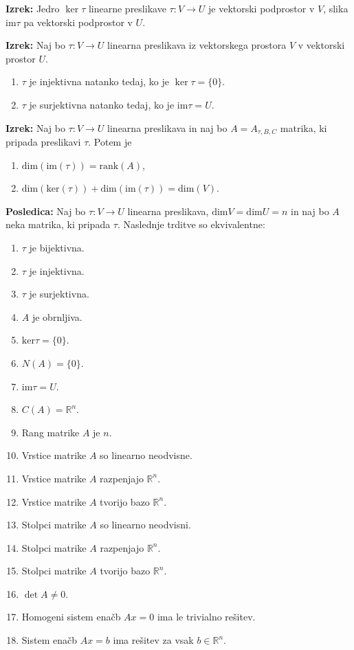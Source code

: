 \documentclass{article}
\begin{document}
\begin{multicols}{2}
\textbf{Izrek:} Jedro \( \ker \tau \) linearne preslikave \( \tau: V \rightarrow U \) je vektorski podprostor v \( V \), slika \( \text{im} \tau \) pa vektorski podprostor v \( U \).

\textbf{Izrek:} Naj bo \( \tau: V \rightarrow U \) linearna preslikava iz vektorskega prostora \( V \) v vektorski prostor \( U \).
\begin{enumerate}
    \item \( \tau \) je injektivna natanko tedaj, ko je \( \ker \tau = \{0\} \).
    \item \( \tau \) je surjektivna natanko tedaj, ko je \( \text{im} \tau = U \).
\end{enumerate}

\textbf{Izrek:} Naj bo \( \tau: V \rightarrow U \) linearna preslikava in naj bo \( A = A_{\tau,B,C} \) matrika, ki pripada preslikavi \( \tau \). Potem je
\begin{enumerate}
    \item \( \text{dim}(\text{im}(\tau)) = \text{rank}(A) \),
    \item \( \text{dim}(\text{ker}(\tau)) + \text{dim}(\text{im}(\tau)) = \text{dim}(V) \).
\end{enumerate}

\textbf{Posledica:} Naj bo \( \tau: V \rightarrow U \) linearna preslikava, \(\text{dim} V = \text{dim} U = n\) in naj bo \( A \) neka matrika, ki pripada \( \tau \). Naslednje trditve so ekvivalentne:
\begin{enumerate}
    \item \( \tau \) je bijektivna.
    \item \( \tau \) je injektivna.
    \item \( \tau \) je surjektivna.
    \item \( A \) je obrnljiva.
    \item \( \text{ker} \tau = \{0\} \).
    \item \( N(A) = \{0\} \).
    \item \( \text{im} \tau = U \).
    \item \( C(A) = \mathbb{R}^n \).
    \item Rang matrike \( A \) je \( n \).
    \item Vrstice matrike \( A \) so linearno neodvisne.
    \item Vrstice matrike \( A \) razpenjajo \( \mathbb{R}^n \).
    \item Vrstice matrike \( A \) tvorijo bazo \( \mathbb{R}^n \).
    \item Stolpci matrike \( A \) so linearno neodvisni.
    \item Stolpci matrike \( A \) razpenjajo \( \mathbb{R}^n \).
    \item Stolpci matrike \( A \) tvorijo bazo \( \mathbb{R}^n \).
    \item \( \det A \neq 0 \).
    \item Homogeni sistem enačb \( Ax = 0 \) ima le trivialno rešitev.
    \item Sistem enačb \( Ax = b \) ima rešitev za vsak \( b \in \mathbb{R}^n \).
\end{enumerate}


\end{multicols}
\end{document}
